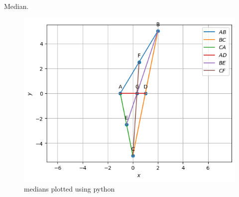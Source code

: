 \begin{table}[H]
        \centering
        
        \caption{Median.}
        \label{tab:Median}
    \end{table}
\begin{figure}[H]
\includegraphics[width=\columnwidth]{1.2/figs/median.png}
\caption{medians plotted using python}
\label{fig:i_median_py}
\end{figure}

